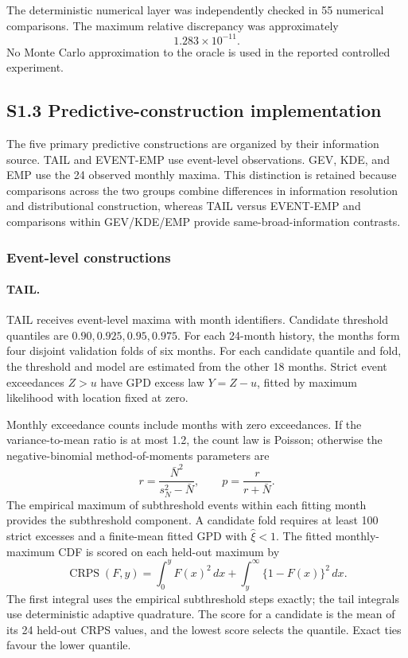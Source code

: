 \documentclass[]{interact}
\begin{document}
The deterministic numerical layer was independently checked in
55 numerical comparisons. The maximum relative discrepancy was
approximately
\[
1.283\times10^{-11}.
\]
No Monte Carlo approximation to the oracle is used in the reported
controlled experiment.



\subsection*{S1.3 Predictive-construction implementation}

The five primary predictive constructions are organized by their
information source. TAIL and EVENT-EMP use event-level observations.
GEV, KDE, and EMP use the 24 observed monthly maxima. This distinction
is retained because comparisons across the two groups combine
differences in information resolution and distributional construction,
whereas TAIL versus EVENT-EMP and comparisons within
GEV/KDE/EMP provide same-broad-information contrasts.


\subsubsection*{Event-level constructions}

\paragraph*{TAIL.}

TAIL receives event-level maxima with month identifiers. Candidate
threshold quantiles are $0.90,0.925,0.95,0.975$. For each 24-month
history, the months form four disjoint validation folds of six months.
For each candidate quantile and fold, the threshold and model are estimated
from the other 18 months. Strict event exceedances $Z>u$ have GPD excess
law $Y=Z-u$, fitted by maximum likelihood with location fixed at zero.

Monthly exceedance counts include months with zero exceedances. If the
variance-to-mean ratio is at most 1.2, the count law is Poisson; otherwise
the negative-binomial method-of-moments parameters are
\[
r=\frac{\bar N^2}{s_N^2-\bar N},\qquad p=\frac{r}{r+\bar N}.
\]
The empirical maximum of subthreshold events within each fitting month
provides the subthreshold component. A candidate fold requires at least
100 strict excesses and a finite-mean fitted GPD with $\widehat\xi<1$.
The fitted monthly-maximum CDF is scored on each held-out maximum by
\[
\operatorname{CRPS}(F,y)
=\int_0^y F(x)^2\,dx+\int_y^\infty\{1-F(x)\}^2\,dx.
\]
The first integral uses the empirical subthreshold steps exactly; the
tail integrals use deterministic adaptive quadrature. The score for a
candidate is the mean of its 24 held-out CRPS values, and the lowest
score selects the quantile. Exact ties favour the lower quantile.
\end{document}
